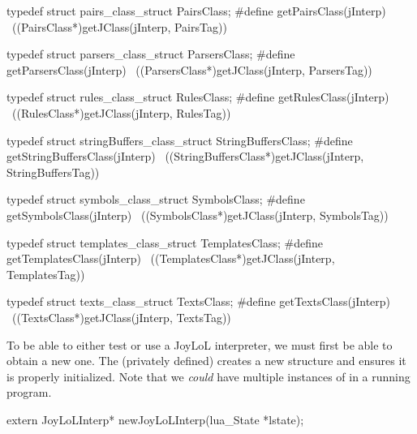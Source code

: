 typedef struct pairs_class_struct PairsClass;
#define getPairsClass(jInterp)                              \
  ((PairsClass*)getJClass(jInterp, PairsTag))

typedef struct parsers_class_struct ParsersClass;
#define getParsersClass(jInterp)                            \
  ((ParsersClass*)getJClass(jInterp, ParsersTag))

typedef struct rules_class_struct RulesClass;
#define getRulesClass(jInterp)                            \
  ((RulesClass*)getJClass(jInterp, RulesTag))

typedef struct stringBuffers_class_struct StringBuffersClass;
#define getStringBuffersClass(jInterp)                      \
  ((StringBuffersClass*)getJClass(jInterp, StringBuffersTag))

typedef struct symbols_class_struct SymbolsClass;
#define getSymbolsClass(jInterp)                            \
  ((SymbolsClass*)getJClass(jInterp, SymbolsTag))
  
typedef struct templates_class_struct TemplatesClass;
#define getTemplatesClass(jInterp)                          \
  ((TemplatesClass*)getJClass(jInterp, TemplatesTag))

typedef struct texts_class_struct TextsClass;
#define getTextsClass(jInterp)                              \
  ((TextsClass*)getJClass(jInterp, TextsTag))
\stopCHeader

\startTestSuite[newJoyLoLInterp]

To be able to either test or use a JoyLoL interpreter, we must first be 
able to obtain a new one. The (privately defined)  
creates a new  structure and ensures it is properly 
initialized. Note that we \emph{could} have multiple instances of 
\type{JoyLoLInterp} in a running program. 

\startCHeader
extern JoyLoLInterp* newJoyLoLInterp(lua_State *lstate);
\stopCHeader
\setCHeaderStream{public}

